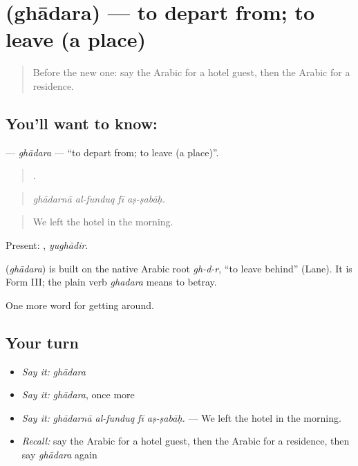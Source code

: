 \section[\texorpdfstring{\ar{غادر} (ghādara)}{غادر (ghādara)}]{ (ghādara) — to depart from; to leave (a place)}

\label{lesson:AR-C441-ghadara}



\begin{quote}
Before the new one: say the Arabic for a hotel guest, then the Arabic for a residence.
\end{quote}

\subsection*{You'll want to know: }
\textbf{} — \emph{ghādara} — \textquotedblleft{}to depart from; to leave (a place)\textquotedblright{}.

\begin{quote}
   .
\end{quote}

\begin{quote}
\emph{ghādarnā al-funduq fī aṣ-ṣabāḥ.}
\end{quote}

\begin{quote}
We left the hotel in the morning.
\end{quote}

Present: , \emph{yughādir}.

\begin{cousinweb}
\textbf{} (\emph{ghādara}) is built on the native Arabic root \emph{gh-d-r}, \textquotedblleft{}to leave behind\textquotedblright{} (Lane). It is Form III; the plain verb \emph{ghadara} means to betray.
\end{cousinweb}

\begin{grammarlens}[title={What you've built}]
One more word for getting around.
\end{grammarlens}

\subsection*{Your turn}
\begin{itemize}
\raggedright
  \item \emph{Say it:} \emph{ghādara}
  \item \emph{Say it:} \emph{ghādara}, once more
  \item \emph{Say it:} \emph{ghādarnā al-funduq fī aṣ-ṣabāḥ.} — We left the hotel in the morning.
  \item \emph{Recall:} say the Arabic for a hotel guest, then the Arabic for a residence, then say \emph{ghādara} again
\end{itemize}

